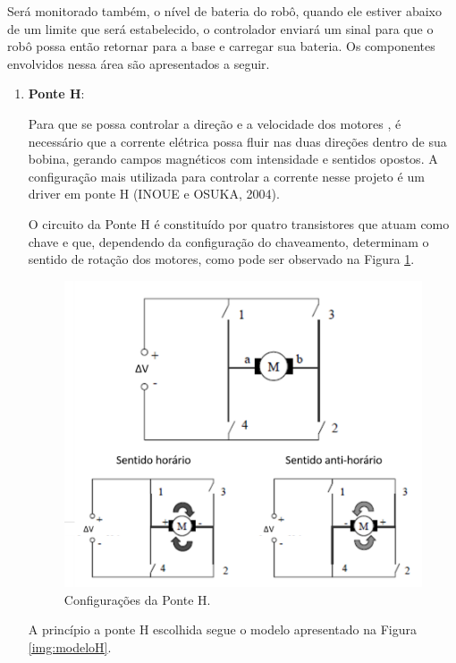 			Será monitorado também, o nível de bateria do robô, quando ele estiver abaixo de um limite que será estabelecido, o controlador enviará um sinal para que o robô possa então retornar para a base e carregar sua bateria. Os componentes envolvidos nessa área são apresentados a seguir.

			\begin{enumerate}
				\item \textbf{Ponte H}:

					Para que se possa controlar a direção e a velocidade dos motores , é necessário que a corrente elétrica possa fluir nas duas direções dentro de sua bobina, gerando campos magnéticos com intensidade e sentidos opostos. A configuração mais utilizada para controlar a corrente nesse projeto é um driver em ponte H (INOUE e OSUKA, 2004).

					O circuito da Ponte H é constituído por quatro transistores que atuam como chave e que, dependendo da configuração do chaveamento, determinam o sentido de rotação dos motores, como pode ser observado na Figura \ref{img:configH}.

					\begin{figure}[H]
						\centering
						\includegraphics[scale=0.3]{figuras/configH.png}
						\caption{Configurações da Ponte H.}
						\label{img:configH}
					\end{figure}

					A princípio a ponte H escolhida segue o modelo apresentado na Figura \ref{img:modeloH}. 


\end{enumerate}
